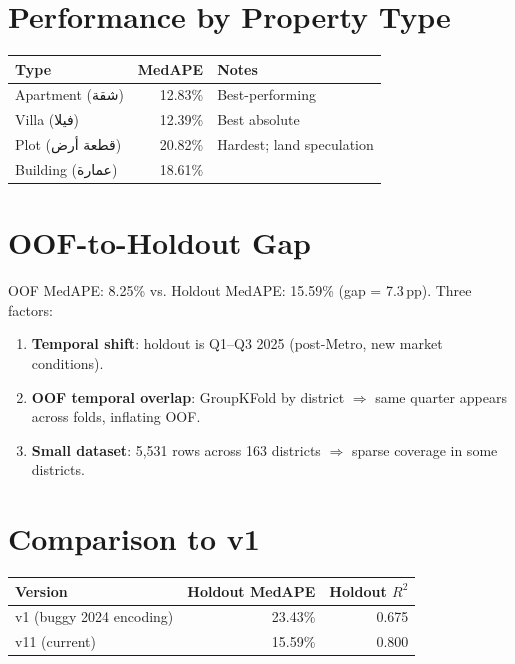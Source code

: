 \documentclass[11pt, a4paper, twoside]{report}
\begin{document}
\section{Performance by Property Type}
\begin{table}[H]
  \centering
  \begin{tabular}{lrl}
    \toprule
    Type & MedAPE & Notes \\
    \midrule
    Apartment (شقة)  & 12.83\% & Best-performing \\
    Villa (فيلا)     & 12.39\% & Best absolute \\
    Plot (قطعة أرض)  & 20.82\% & Hardest; land speculation \\
    Building (عمارة) & 18.61\% & \\
    \bottomrule
  \end{tabular}
\end{table}

\section{OOF-to-Holdout Gap}
OOF MedAPE: 8.25\% vs. Holdout MedAPE: 15.59\% (gap = 7.3\,pp). Three factors:
\begin{enumerate}
  \item \textbf{Temporal shift}: holdout is Q1--Q3 2025 (post-Metro, new market
        conditions).
  \item \textbf{OOF temporal overlap}: GroupKFold by district $\Rightarrow$ same
        quarter appears across folds, inflating OOF.
  \item \textbf{Small dataset}: 5,531 rows across 163 districts $\Rightarrow$
        sparse coverage in some districts.
\end{enumerate}

\section{Comparison to v1}
\begin{table}[H]
  \centering
  \begin{tabular}{lrr}
    \toprule
    Version & Holdout MedAPE & Holdout $R^2$ \\
    \midrule
    v1 (buggy 2024 encoding) & 23.43\% & 0.675 \\
    v11 (current)            & 15.59\% & 0.800 \\
    \bottomrule
  \end{tabular}
\end{table}
\end{document}
